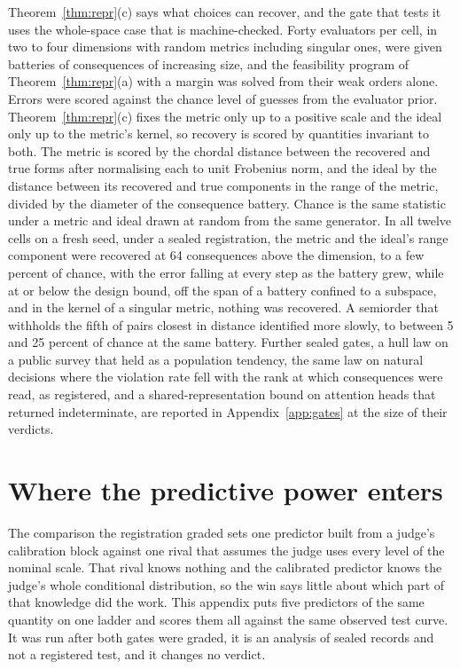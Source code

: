 \documentclass{article}
\theoremstyle{definition}
\theoremstyle{remark}
\begin{document}
Theorem~\ref{thm:repr}(c) says what choices can recover, and the gate that tests it uses the whole-space case that is machine-checked.
Forty evaluators per cell, in two to four dimensions with random metrics including singular ones, were given batteries of consequences of increasing size, and the feasibility program of Theorem~\ref{thm:repr}(a) with a margin was solved from their weak orders alone.
Errors were scored against the chance level of guesses from the evaluator prior.
Theorem~\ref{thm:repr}(c) fixes the metric only up to a positive scale and the ideal only up to the metric's kernel, so recovery is scored by quantities invariant to both. The metric is scored by the chordal distance between the recovered and true forms after normalising each to unit Frobenius norm, and the ideal by the distance between its recovered and true components in the range of the metric, divided by the diameter of the consequence battery. Chance is the same statistic under a metric and ideal drawn at random from the same generator.
In all twelve cells on a fresh seed, under a sealed registration, the metric and the ideal's range component were recovered at 64 consequences above the dimension, to a few percent of chance, with the error falling at every step as the battery grew, while at or below the design bound, off the span of a battery confined to a subspace, and in the kernel of a singular metric, nothing was recovered.
A semiorder that withholds the fifth of pairs closest in distance identified more slowly, to between 5 and 25 percent of chance at the same battery.
Further sealed gates, a hull law on a public survey that held as a population tendency, the same law on natural decisions where the violation rate fell with the rank at which consequences were read, as registered, and a shared-representation bound on attention heads that returned indeterminate, are reported in Appendix~\ref{app:gates} at the size of their verdicts.

\fi

\section{Where the predictive power enters}
\label{app:ladder}

The comparison the registration graded sets one predictor built from a judge's calibration block
against one rival that assumes the judge uses every level of the nominal scale. That rival knows
nothing and the calibrated predictor knows the judge's whole conditional distribution, so the win
says little about which part of that knowledge did the work. This appendix puts five predictors of
the same quantity on one ladder and scores them all against the same observed test curve. It was run
after both gates were graded, it is an analysis of sealed records and not a registered test, and it
changes no verdict.
\end{document}
